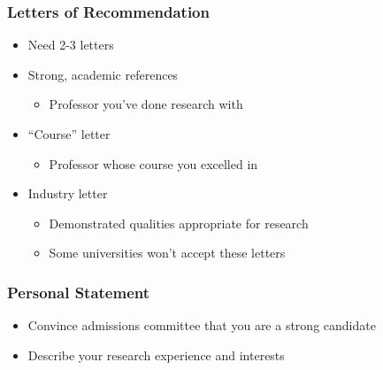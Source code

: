 \documentclass{beamer}
\begin{document}
\begin{frame}
  \frametitle{Letters of Recommendation}
  \begin{itemize}
    \item Need 2-3 letters
    \item Strong, academic references
      \begin{itemize}
        \item Professor you've done research with
      \end{itemize}
    \item ``Course'' letter
      \begin{itemize}
        \item Professor whose course you excelled in
      \end{itemize}
    \item Industry letter
      \begin{itemize}
        \item Demonstrated qualities appropriate for research
        \item Some universities won't accept these letters
      \end{itemize}
  \end{itemize}
\end{frame}

\begin{frame}
  \frametitle{Personal Statement}
  \begin{itemize}
    \item Convince admissions committee that you are a strong candidate
    \item Describe your research experience and interests
  \end{itemize}
\end{frame}
\end{document}

